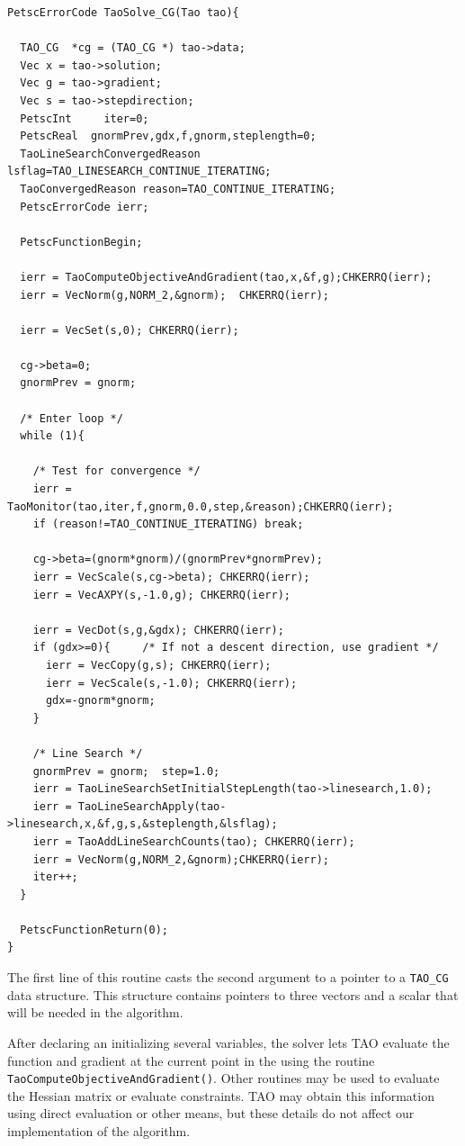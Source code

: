 \documentclass[]{book}
\begin{document}
\begin{verbatim}
PetscErrorCode TaoSolve_CG(Tao tao){

  TAO_CG  *cg = (TAO_CG *) tao->data;
  Vec x = tao->solution;
  Vec g = tao->gradient;
  Vec s = tao->stepdirection;
  PetscInt     iter=0;
  PetscReal  gnormPrev,gdx,f,gnorm,steplength=0;
  TaoLineSearchConvergedReason lsflag=TAO_LINESEARCH_CONTINUE_ITERATING;
  TaoConvergedReason reason=TAO_CONTINUE_ITERATING;
  PetscErrorCode ierr;

  PetscFunctionBegin;

  ierr = TaoComputeObjectiveAndGradient(tao,x,&f,g);CHKERRQ(ierr);
  ierr = VecNorm(g,NORM_2,&gnorm);  CHKERRQ(ierr);

  ierr = VecSet(s,0); CHKERRQ(ierr); 

  cg->beta=0;
  gnormPrev = gnorm;

  /* Enter loop */
  while (1){

    /* Test for convergence */
    ierr = TaoMonitor(tao,iter,f,gnorm,0.0,step,&reason);CHKERRQ(ierr);
    if (reason!=TAO_CONTINUE_ITERATING) break;

    cg->beta=(gnorm*gnorm)/(gnormPrev*gnormPrev);
    ierr = VecScale(s,cg->beta); CHKERRQ(ierr);
    ierr = VecAXPY(s,-1.0,g); CHKERRQ(ierr);
    
    ierr = VecDot(s,g,&gdx); CHKERRQ(ierr);
    if (gdx>=0){     /* If not a descent direction, use gradient */
      ierr = VecCopy(g,s); CHKERRQ(ierr);
      ierr = VecScale(s,-1.0); CHKERRQ(ierr);
      gdx=-gnorm*gnorm;
    } 

    /* Line Search */
    gnormPrev = gnorm;  step=1.0;
    ierr = TaoLineSearchSetInitialStepLength(tao->linesearch,1.0);
    ierr = TaoLineSearchApply(tao->linesearch,x,&f,g,s,&steplength,&lsflag);
    ierr = TaoAddLineSearchCounts(tao); CHKERRQ(ierr);
    ierr = VecNorm(g,NORM_2,&gnorm);CHKERRQ(ierr);
    iter++;
  }
  
  PetscFunctionReturn(0);
}
\end{verbatim}

The first line of this routine casts the second argument to a pointer
to a {\tt TAO\_CG} data structure.  This structure contains pointers
to three vectors and a scalar that will be needed in the algorithm.

After declaring an initializing several variables, the solver lets TAO 
evaluate the function and gradient at the
current point in the using the routine 
{\tt Tao\-Compute\-Objective\-And\-Gradient()}.
Other routines may be used to evaluate the Hessian matrix or evaluate
constraints.  TAO may obtain this information using direct evaluation 
or other means, but these details do not affect our implementation
of the algorithm.
\end{document}
